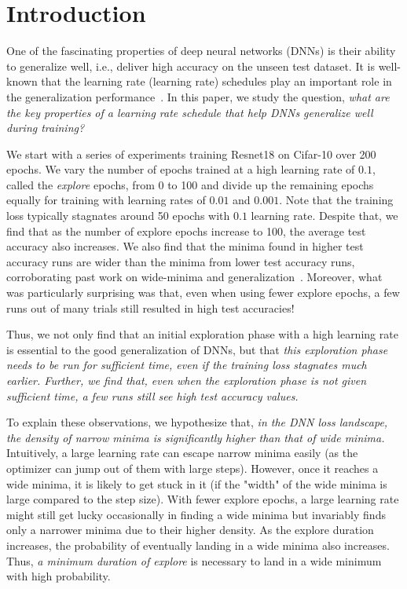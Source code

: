 \documentclass[twoside,11pt]{article}
\begin{document}
\section{Introduction}
\label{sec:introduction}

One of the fascinating properties of deep neural networks (DNNs) is their ability to generalize well, i.e., deliver high accuracy on the unseen test dataset. It is well-known that the learning rate (learning rate) schedules  play an important role in the generalization performance~\citep{keskar2016large,wu2018sgd,goyal-imagenet-in-an-hour-2017}. In this paper, we study the question, {\it what are the key properties of a learning rate schedule that help DNNs generalize well during training?} 







We start with a series of experiments training Resnet18 on Cifar-10 over 200 epochs. We vary the number of epochs trained at a high learning rate of $0.1$, called the {\it explore} epochs, from 0 to 100  and divide up the remaining epochs equally for training with learning rates of $0.01$ and $0.001$. Note that the training loss typically stagnates around 50 epochs with $0.1$ learning rate. Despite that, we find that as the number of explore epochs increase to 100, the average test accuracy also increases. We also find that the minima found in higher test accuracy runs are wider than the minima from lower test accuracy runs, corroborating past work on wide-minima and generalization~\citep{keskar2016large,hochreiter1997flat,jastrzkebski2017three,wang2018identifying}. Moreover, what was particularly surprising was that, even when using fewer explore epochs, a few runs out of many trials still resulted in high test accuracies!

Thus, we not only find that an initial exploration phase with a high learning rate is essential to the good generalization of DNNs, but that {\it this exploration phase needs to be run for sufficient time, even if the training loss stagnates much earlier. Further, we find that, even when the exploration phase is not given sufficient time, a few runs still see high test accuracy values.}






To explain these observations, we hypothesize that, {\it in the DNN loss landscape, the density of narrow minima is significantly higher than that of wide minima.} Intuitively, a large learning rate can escape narrow minima easily (as the optimizer can jump out of them with large steps). However, once it reaches a wide minima, it is likely to get stuck in it (if the "width" of the wide minima is large compared to the step size). With fewer explore epochs, a large learning rate might still get lucky occasionally in finding a wide minima but invariably finds only a narrower minima due to their higher density. As the explore duration increases, the probability of eventually landing in a wide minima also increases. Thus, {\it a minimum duration of explore} is necessary to land in a wide minimum with high probability. 
\end{document}
